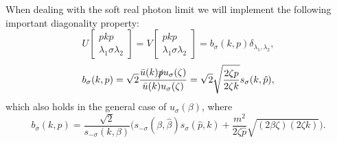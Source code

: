When dealing with the soft real photon limit we will implement the following important diagonality property:
\begin{equation}
U\left[\begin{array}{c}
pkp\\\lambda_1\sigma\lambda_2
\end{array}\right]=V\left[\begin{array}{c}
pkp\\\lambda_1\sigma\lambda_2
\end{array}\right]=b_\sigma(k,p)\delta_{\lambda_1,\lambda_2},
\end{equation}
\begin{equation}
b_\sigma(k,p)=\sqrt{2}\frac{\bar{u}(k)\slashed p u_\sigma(\zeta)}{\bar{u}(k)u_\sigma(\zeta)}=\sqrt{2}\sqrt{\frac{2\zeta p}{2\zeta k}}s_\sigma(k,\hat{p}),
\end{equation}
which also holds in the general case of $u_\sigma(\beta)$, where
\begin{equation}
b_\sigma(k,p)=\frac{\sqrt{2}}{s_{-\sigma}(k,\beta)}\biggl( s_{-\sigma}(\beta,\hat{\beta})s_\sigma(\hat{p},k)+\frac{m^2}{2\zeta\hat{p}} \sqrt{(2\beta\zeta)(2\zeta k)}\biggr).
\end{equation}